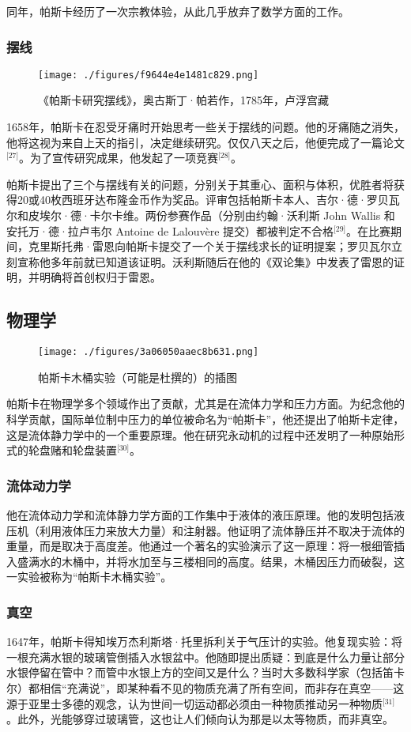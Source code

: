 同年，帕斯卡经历了一次宗教体验，从此几乎放弃了数学方面的工作。
\subsubsection{摆线}
\begin{figure}[ht]
\centering
\texttt{[image: ./figures/f9644e4e1481c829.png]}
\caption{《帕斯卡研究摆线》，奥古斯丁·帕若作，1785年，卢浮宫藏} \label{fig_BLSpsk_5}
\end{figure}
1658年，帕斯卡在忍受牙痛时开始思考一些关于摆线的问题。他的牙痛随之消失，他将这视为来自上天的指引，决定继续研究。仅仅八天之后，他便完成了一篇论文\(^\text{[27]}\)。为了宣传研究成果，他发起了一项竞赛\(^\text{[28]}\)。

帕斯卡提出了三个与摆线有关的问题，分别关于其重心、面积与体积，优胜者将获得20或40枚西班牙达布隆金币作为奖品。评审包括帕斯卡本人、吉尔·德·罗贝瓦尔和皮埃尔·德·卡尔卡维。两份参赛作品（分别由约翰·沃利斯 John Wallis 和安托万·德·拉卢韦尔 Antoine de Lalouvère 提交）都被判定不合格\(^\text{[29]}\)。在比赛期间，克里斯托弗·雷恩向帕斯卡提交了一个关于摆线求长的证明提案；罗贝瓦尔立刻宣称他多年前就已知道该证明。沃利斯随后在他的《双论集》中发表了雷恩的证明，并明确将首创权归于雷恩。
\subsection{物理学}
\begin{figure}[ht]
\centering
\texttt{[image: ./figures/3a06050aaec8b631.png]}
\caption{帕斯卡木桶实验（可能是杜撰的）的插图} \label{fig_BLSpsk_6}
\end{figure}
帕斯卡在物理学多个领域作出了贡献，尤其是在流体力学和压力方面。为纪念他的科学贡献，国际单位制中压力的单位被命名为“帕斯卡”，他还提出了帕斯卡定律，这是流体静力学中的一个重要原理。他在研究永动机的过程中还发明了一种原始形式的轮盘赌和轮盘装置\(^\text{[30]}\)。
\subsubsection{流体动力学}
他在流体动力学和流体静力学方面的工作集中于液体的液压原理。他的发明包括液压机（利用液体压力来放大力量）和注射器。他证明了流体静压并不取决于流体的重量，而是取决于高度差。他通过一个著名的实验演示了这一原理：将一根细管插入盛满水的木桶中，并将水加至与三楼相同的高度。结果，木桶因压力而破裂，这一实验被称为“帕斯卡木桶实验”。
\subsubsection{真空}
1647年，帕斯卡得知埃万杰利斯塔·托里拆利关于气压计的实验。他复现实验：将一根充满水银的玻璃管倒插入水银盆中。他随即提出质疑：到底是什么力量让部分水银停留在管中？而管中水银上方的空间又是什么？当时大多数科学家（包括笛卡尔）都相信“充满说”，即某种看不见的物质充满了所有空间，而非存在真空——这源于亚里士多德的观念，认为世间一切运动都必须由一种物质推动另一种物质\(^\text{[31]}\)。此外，光能够穿过玻璃管，这也让人们倾向认为那是以太等物质，而非真空。

